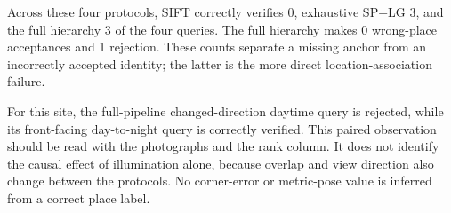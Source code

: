 Across these four protocols, SIFT correctly verifies 0, exhaustive SP+LG 3, and the full hierarchy 3 of the four queries. The full hierarchy makes 0 wrong-place acceptances and 1 rejection. These counts separate a missing anchor from an incorrectly accepted identity; the latter is the more direct location-association failure.

For this site, the full-pipeline changed-direction daytime query is rejected, while its front-facing day-to-night query is correctly verified. This paired observation should be read with the photographs and the rank column. It does not identify the causal effect of illumination alone, because overlap and view direction also change between the protocols. No corner-error or metric-pose value is inferred from a correct place label.
